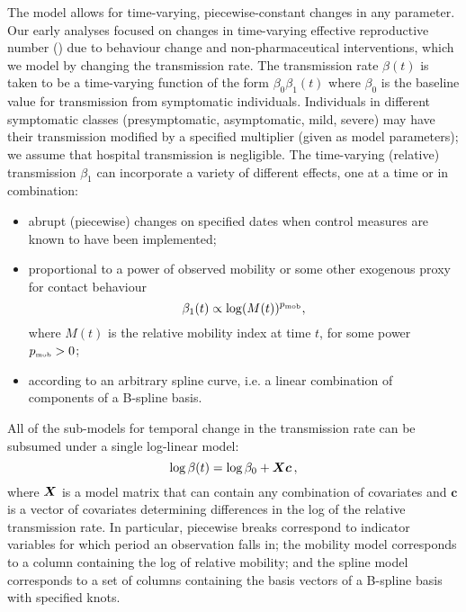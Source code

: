 \documentclass[12pt]{article}\usepackage[]{graphicx}\usepackage[]{color}
\begin{document}
The model allows for time-varying, piecewise-constant changes in any parameter. 
Our early analyses focused on changes in time-varying effective reproductive number (\Rt) due to behaviour change and non-pharmaceutical interventions, which we model by changing the transmission rate.
The transmission rate $\beta(t)$ is taken to be a time-varying function of the form $\beta_0 \beta_1(t)$ where $\beta_0$ is the baseline value for transmission from symptomatic individuals.
Individuals in different symptomatic classes (presymptomatic, asymptomatic, mild, severe) may have their transmission modified by a specified multiplier (given as model parameters); we assume that hospital transmission is negligible.
The time-varying (relative) transmission $\beta_1$ can incorporate a variety of different effects, one at a time or in combination:
\begin{itemize}
\item abrupt (piecewise) changes on specified dates when control measures are known to have been implemented;
\item proportional to a power of observed mobility or some other exogenous proxy for contact behaviour
\[
  \beta_1(t) \propto \log(M(t))^{{{p}_{\textrm{\tiny mob}}}}, 
  \]
where $M(t)$ is the relative mobility index at time $t$, for some power ${{p}_{\textrm{\tiny mob}}}>0$;
\item according to an arbitrary spline curve, i.e. a linear combination of components of a B-spline basis.
\end{itemize}

All of the sub-models for temporal change in the transmission rate can be subsumed under a single log-linear model:
\begin{equation}\label{eq:betamodel}
\log \beta(t) = \log \beta_0 + \boldsymbol{X}\boldsymbol{c}
\,,
\end{equation}
where $\boldsymbol{X}$ is a model matrix that can contain any combination of covariates and $\boldsymbol{c}$ is a vector of covariates determining differences in the log of the relative transmission rate.
In particular, piecewise breaks correspond to indicator variables for which period an observation falls in; the mobility model corresponds to a column containing the log of relative mobility; and the spline model corresponds to a set of columns containing the basis vectors of a B-spline basis with specified knots.
\end{document}
